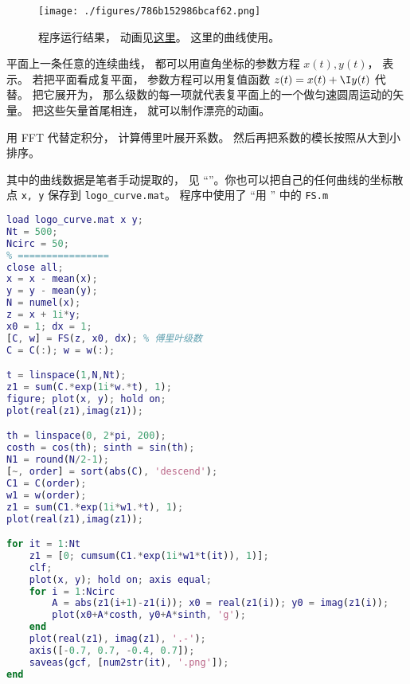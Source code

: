 
\begin{issues}
\issueDraft
\end{issues}


\begin{figure}[ht]
\centering
\texttt{[image: ./figures/786b152986bcaf62.png]}
\caption{程序运行结果， 动画见\href{https://wuli.wiki/apps/FFTplt.html}{这里}。 这里的曲线使用。} \label{fig_FFTdrw_1}
\end{figure}

平面上一条任意的连续曲线， 都可以用直角坐标的参数方程 $x(t), y(t)$， 表示。 若把平面看成复平面， 参数方程可以用复值函数 $z(t) = x(t) + \I y(t)$ 代替。 把它展开为， 那么级数的每一项就代表复平面上的一个做匀速圆周运动的矢量。 把这些矢量首尾相连， 就可以制作漂亮的动画。

用 FFT 代替定积分， 计算傅里叶展开系数。 然后再把系数的模长按照从大到小排序。

其中的曲线数据是笔者手动提取的， 见 “”。你也可以把自己的任何曲线的坐标散点 \verb|x, y| 保存到 \verb|logo_curve.mat|。 程序中使用了 “用 ” 中的 \verb|FS.m|

\begin{lstlisting}[language=matlab, caption=FFTplt.m]
% ==== 参数设置 ====
load logo_curve.mat x y;
Nt = 500;
Ncirc = 50;
% ================
close all;
x = x - mean(x);
y = y - mean(y);
N = numel(x);
z = x + 1i*y;
x0 = 1; dx = 1;
[C, w] = FS(z, x0, dx); % 傅里叶级数
C = C(:); w = w(:);

t = linspace(1,N,Nt);
z1 = sum(C.*exp(1i*w.*t), 1);
figure; plot(x, y); hold on;
plot(real(z1),imag(z1));

th = linspace(0, 2*pi, 200);
costh = cos(th); sinth = sin(th);
N1 = round(N/2-1);
[~, order] = sort(abs(C), 'descend');
C1 = C(order);
w1 = w(order);
z1 = sum(C1.*exp(1i*w1.*t), 1);
plot(real(z1),imag(z1));

for it = 1:Nt
    z1 = [0; cumsum(C1.*exp(1i*w1*t(it)), 1)];
    clf;
    plot(x, y); hold on; axis equal;
    for i = 1:Ncirc
        A = abs(z1(i+1)-z1(i)); x0 = real(z1(i)); y0 = imag(z1(i));
        plot(x0+A*costh, y0+A*sinth, 'g');
    end
    plot(real(z1), imag(z1), '.-');
    axis([-0.7, 0.7, -0.4, 0.7]);
    saveas(gcf, [num2str(it), '.png']);
end
\end{lstlisting}
